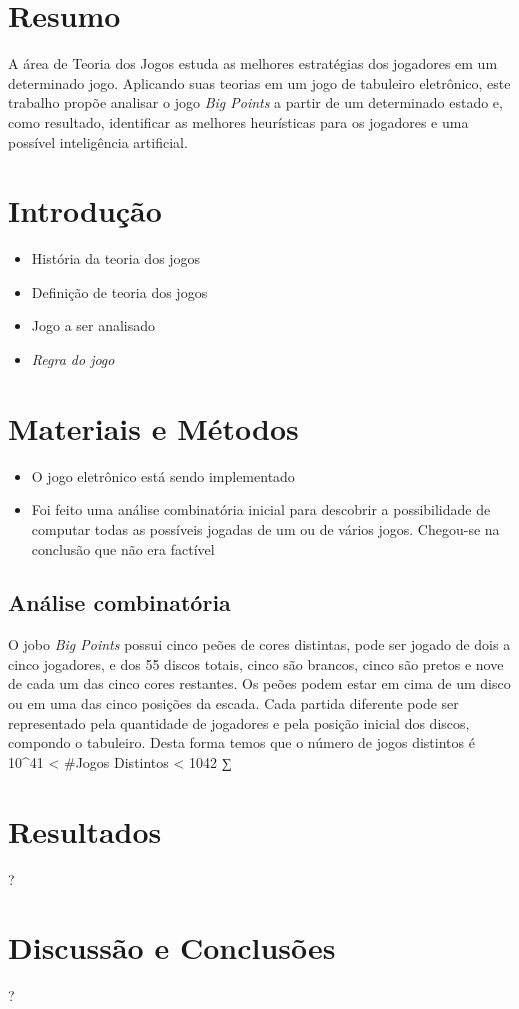 \section{Resumo}\label{resumo}

A área de Teoria dos Jogos estuda as melhores estratégias dos jogadores
em um determinado jogo. Aplicando suas teorias em um jogo de tabuleiro
eletrônico, este trabalho propõe analisar o jogo \emph{Big Points} a
partir de um determinado estado e, como resultado, identificar as
melhores heurísticas para os jogadores e uma possível inteligência
artificial.

\section{Introdução}\label{introduuxe7uxe3o}

\begin{itemize}
\itemsep1pt\parskip0pt
\item
  História da teoria dos jogos
\item
  Definição de teoria dos jogos
\item
  Jogo a ser analisado
\item
  \emph{Regra do jogo}
\end{itemize}

\section{Materiais e Métodos}\label{materiais-e-muxe9todos}

\begin{itemize}
\itemsep1pt\parskip0pt
\item
  O jogo eletrônico está sendo implementado
\item
  Foi feito uma análise combinatória inicial para descobrir a
  possibilidade de computar todas as possíveis jogadas de um ou de
  vários jogos. Chegou-se na conclusão que não era factível
\end{itemize}

\subsection{Análise combinatória}\label{anuxe1lise-combinatuxf3ria}

O jobo \emph{Big Points} possui cinco peões de cores distintas, pode ser
jogado de dois a cinco jogadores, e dos 55 discos totais, cinco são
brancos, cinco são pretos e nove de cada um das cinco cores restantes.
Os peões podem estar em cima de um disco ou em uma das cinco posições da
escada. Cada partida diferente pode ser representado pela quantidade de
jogadores e pela posição inicial dos discos, compondo o tabuleiro. Desta
forma temos que o número de jogos distintos é 10\^{}41 \textless{}
\#Jogos Distintos \textless{} 1042 ∑

\section{Resultados}\label{resultados}

?

\section{Discussão e Conclusões}\label{discussuxe3o-e-conclusuxf5es}

?
